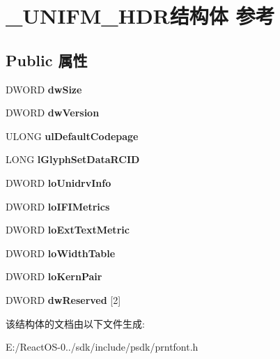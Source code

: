 \hypertarget{struct___u_n_i_f_m___h_d_r}{}\section{\+\_\+\+U\+N\+I\+F\+M\+\_\+\+H\+D\+R结构体 参考}
\label{struct___u_n_i_f_m___h_d_r}
\subsection*{Public 属性}
\begin{DoxyCompactItemize}
\item 
\mbox{\label{struct___u_n_i_f_m___h_d_r_aefbb6c6286787cb74e7bd322c3a662ef}} 
D\+W\+O\+RD {\bfseries dw\+Size}
\item 
\mbox{\label{struct___u_n_i_f_m___h_d_r_a4d46f1194233708590180dd2c726b88c}} 
D\+W\+O\+RD {\bfseries dw\+Version}
\item 
\mbox{\label{struct___u_n_i_f_m___h_d_r_abe552ece6858cec2689a0460a69a0d2c}} 
U\+L\+O\+NG {\bfseries ul\+Default\+Codepage}
\item 
\mbox{\label{struct___u_n_i_f_m___h_d_r_a01cbcb92657fdabed7340a0a66048cba}} 
L\+O\+NG {\bfseries l\+Glyph\+Set\+Data\+R\+C\+ID}
\item 
\mbox{\label{struct___u_n_i_f_m___h_d_r_af1282f3e3e423091f3540cb3435296ee}} 
D\+W\+O\+RD {\bfseries lo\+Unidrv\+Info}
\item 
\mbox{\label{struct___u_n_i_f_m___h_d_r_ac30d7e018d8f4298fd3a62b127754dee}} 
D\+W\+O\+RD {\bfseries lo\+I\+F\+I\+Metrics}
\item 
\mbox{\label{struct___u_n_i_f_m___h_d_r_a2702c4ad67b0b23bba062571a86a06ba}} 
D\+W\+O\+RD {\bfseries lo\+Ext\+Text\+Metric}
\item 
\mbox{\label{struct___u_n_i_f_m___h_d_r_a2462d56461207c156605beeeefbe41b9}} 
D\+W\+O\+RD {\bfseries lo\+Width\+Table}
\item 
\mbox{\label{struct___u_n_i_f_m___h_d_r_a68ac01701d7d8ed1b3183162db9ed491}} 
D\+W\+O\+RD {\bfseries lo\+Kern\+Pair}
\item 
\mbox{\label{struct___u_n_i_f_m___h_d_r_af600c0dfcc665451fc00a4378d0c39d0}} 
D\+W\+O\+RD {\bfseries dw\+Reserved} \mbox{[}2\mbox{]}
\end{DoxyCompactItemize}


该结构体的文档由以下文件生成\+:\begin{DoxyCompactItemize}
\item 
E\+:/\+React\+O\+S-\/0../sdk/include/psdk/prntfont.\+h\end{DoxyCompactItemize}
